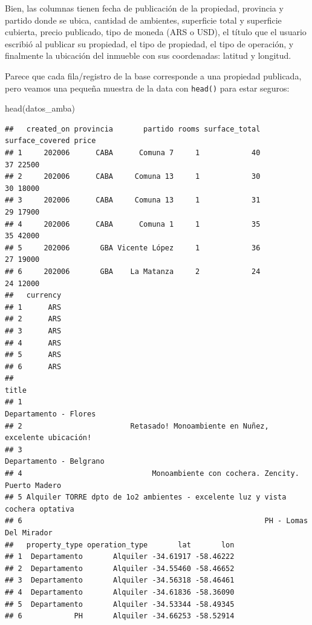 \documentclass[
  spanish,
]{book}
\newenvironment{Shaded}{\begin{snugshade}}{\end{snugshade}}
\newcommand{\FunctionTok}[1]{\textcolor[rgb]{0.00,0.00,0.00}{#1}}
\newcommand{\NormalTok}[1]{#1}
\begin{document}
Bien, las columnas tienen fecha de publicación de la propiedad, provincia y partido donde se ubica, cantidad de ambientes, superficie total y superficie cubierta, precio publicado, tipo de moneda (ARS o USD), el título que el usuario escribió al publicar su propiedad, el tipo de propiedad, el tipo de operación, y finalmente la ubicación del inmueble con sus coordenadas: latitud y longitud.

Parece que cada fila/registro de la base corresponde a una propiedad publicada, pero veamos una pequeña muestra de la data con \texttt{head()} para estar seguros:

\begin{Shaded}
\begin{Highlighting}[]
\FunctionTok{head}\NormalTok{(datos\_amba)}
\end{Highlighting}
\end{Shaded}

\begin{verbatim}
##   created_on provincia       partido rooms surface_total surface_covered price
## 1     202006      CABA      Comuna 7     1            40              37 22500
## 2     202006      CABA     Comuna 13     1            30              30 18000
## 3     202006      CABA     Comuna 13     1            31              29 17900
## 4     202006      CABA      Comuna 1     1            35              35 42000
## 5     202006       GBA Vicente López     1            36              27 19000
## 6     202006       GBA    La Matanza     2            24              24 12000
##   currency
## 1      ARS
## 2      ARS
## 3      ARS
## 4      ARS
## 5      ARS
## 6      ARS
##                                                                           title
## 1                                                         Departamento - Flores
## 2                         Retasado! Monoambiente en Nuñez, excelente ubicación!
## 3                                                       Departamento - Belgrano
## 4                              Monoambiente con cochera. Zencity. Puerto Madero
## 5 Alquiler TORRE dpto de 1o2 ambientes - excelente luz y vista cochera optativa
## 6                                                        PH - Lomas Del Mirador
##   property_type operation_type       lat       lon
## 1  Departamento       Alquiler -34.61917 -58.46222
## 2  Departamento       Alquiler -34.55460 -58.46652
## 3  Departamento       Alquiler -34.56318 -58.46461
## 4  Departamento       Alquiler -34.61836 -58.36090
## 5  Departamento       Alquiler -34.53344 -58.49345
## 6            PH       Alquiler -34.66253 -58.52914
\end{verbatim}
\end{document}
